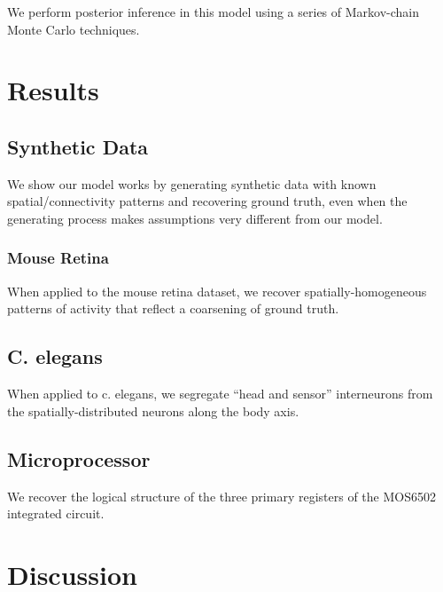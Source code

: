 \documentclass{article}
\begin{document}
We perform posterior inference in this model using a series of Markov-chain
Monte Carlo techniques. 

\section{Results}

\subsection{Synthetic Data}
We show our model works by generating synthetic data with known spatial/connectivity patterns and recovering ground truth, even when the generating process makes assumptions very different from our model. 

\subsubsection{Mouse Retina}
When applied to the mouse retina dataset, we recover spatially-homogeneous patterns of activity that reflect a coarsening of ground truth. 

\subsection{C. elegans}
When applied to c. elegans, we segregate ``head and sensor'' interneurons from the spatially-distributed neurons along the body axis. 

\subsection{Microprocessor}

We recover the logical structure of the three primary registers of the
MOS6502 integrated circuit.


\section{Discussion}
\end{document}
